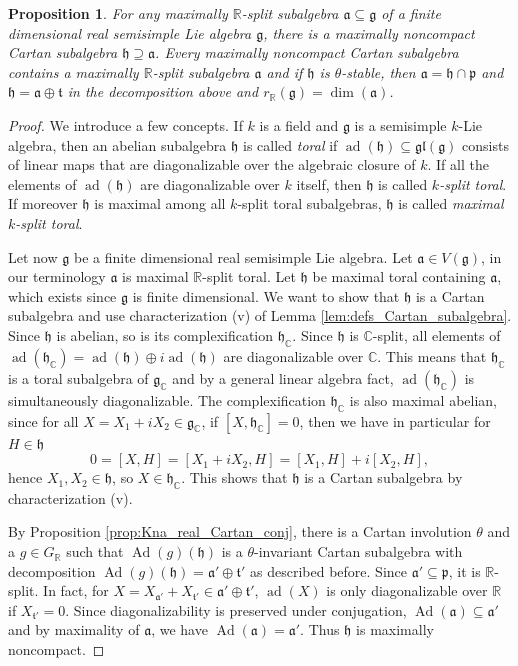 \documentclass[12pt]{amsart}
\newcommand{\R}{\mathbb{R} }
\newcommand{\C}{\mathbb{C} }
\newcommand{\frakg}{\mathfrak{g}}
\newcommand{\frakp}{\mathfrak{p}}
\newcommand{\fraka}{\mathfrak{a}}
\newcommand{\frakh}{\mathfrak{h}}
\newcommand{\frakt}{\mathfrak{t}}
\numberwithin{equation}{section}
\newtheorem{proposition}[theorem]{Proposition}
\theoremstyle{remark} %
\begin{document}
\begin{proposition}\label{prop:defs_max_noncompact}
	For any maximally $\R$-split subalgebra $\fraka \subseteq \frakg$ of a finite dimensional real semisimple Lie algebra $\frakg$, there is a maximally noncompact Cartan subalgebra $\frakh \supseteq \fraka$. Every maximally noncompact Cartan subalgebra contains a maximally $\R$-split subalgebra $\fraka$ and if $\frakh$ is $\theta$-stable, then $\fraka = \frakh \cap \frakp$ and $\frakh = \fraka \oplus \frakt$ in the decomposition above and $r_\R(\frakg) = \dim (\fraka)$.
\end{proposition}
\begin{proof}
	We introduce a few concepts. If $k$ is a field and $\frakg$ is a semisimple $k$-Lie algebra, then an abelian subalgebra $\frakh$ is called \emph{toral} if $\operatorname{ad}(\frakh) \subseteq \mathfrak{gl}(\frakg)$ consists of linear maps that are diagonalizable over the algebraic closure of $k$. If all the elements of $\operatorname{ad}(\frakh)$ are diagonalizable over $k$ itself, then $\frakh$ is called \emph{$k$-split toral}. If moreover $\frakh$ is maximal among all $k$-split toral subalgebras, $\frakh$ is called \emph{maximal $k$-split toral}.
	
	Let now $\frakg$ be a finite dimensional real semisimple Lie algebra. Let $\fraka \in V(\frakg)$, in our terminology $\fraka$ is maximal $\R$-split toral. Let $\frakh$ be maximal toral containing $\fraka$, which exists since $\frakg$ is finite dimensional. We want to show that $\frakh$ is a Cartan subalgebra and use characterization (v) of Lemma \ref{lem:defs_Cartan_subalgebra}. Since $\frakh$ is abelian, so is its complexification $\frakh_\C$. Since $\frakh$ is $\C$-split, all elements of $\operatorname{ad}(\frakh_\C)=\operatorname{ad}(\frakh) \oplus i \operatorname{ad}(\frakh)$ are diagonalizable over $\C$. This means that $\frakh_\C$ is a toral subalgebra of $\frakg_\C$ and by a general linear algebra fact, $\operatorname{ad}(\frakh_\C)$ is simultaneously diagonalizable. The complexification $\frakh_\C$ is also maximal abelian, since for all $X=X_1+iX_2 \in \frakg_\C$, if $[X,\frakh_\C] =0$, then we have in particular for $H \in \frakh$
	$$
	0 = [X,H] = [X_1+iX_2, H] = [X_1, H] + i [X_2, H] ,
	$$
	hence $X_1,X_2 \in \frakh$, so $X \in \frakh_\C$. This shows that $\frakh$ is a Cartan subalgebra by characterization (v).
	
	By Proposition \ref{prop:Kna_real_Cartan_conj}, there is a Cartan involution $\theta$ and a $g\in G_\R$ such that $\operatorname{Ad}(g)(\frakh)$ is a $\theta$-invariant Cartan subalgebra with decomposition $\operatorname{Ad}(g)(\frakh) = \fraka' \oplus \frakt'$ as described before. Since $\fraka' \subseteq \frakp $, it is $\R$-split. In fact, for $X=X_{\fraka'} + X_{\frakt'} \in \fraka' \oplus \frakt'$, $\operatorname{ad}(X)$ is only diagonalizable over $\R$ if $X_{\frakt'}=0$. Since diagonalizability is preserved under conjugation, $\operatorname{Ad}(\fraka) \subseteq \fraka'$ and by maximality of $\fraka$, we have $\operatorname{Ad}(\fraka) = \fraka'$. Thus $\frakh$ is maximally noncompact. 
	

\end{proof}
\end{document}
